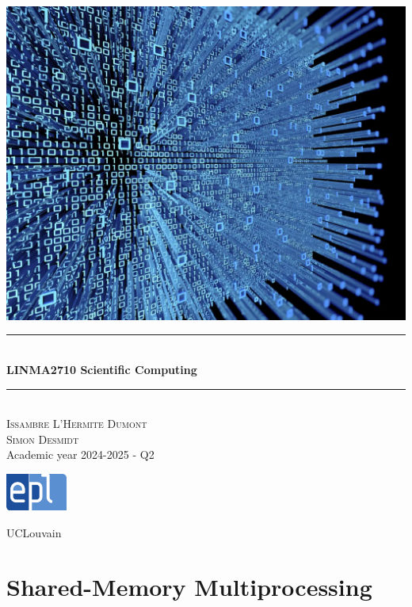 \documentclass[12pt, openany]{report}
\newcommand{\HRule}{\rule{\linewidth}{0.5mm}}
\theoremstyle{definition}
\begin{document}
\begin{titlepage}
    \begin{sffamily}
    \begin{center}
        \includegraphics[scale=0.25]{img/page_de_garde.png} \\[1cm]
        \HRule \\[0.4cm]
        { \huge \bfseries LINMA2710 Scientific Computing \\[0.4cm] }
    
        \HRule \\[1.5cm]
        \textsc{\LARGE Issambre L'Hermite Dumont \\ Simon Desmidt}\\[1cm]
        \vfill
        \vspace{2cm}
        {\large Academic year 2024-2025 - Q2}
        \vspace{0.4cm}
         
        \includegraphics[width=0.15\textwidth]{img/epl.png}
        
        UCLouvain\\
    
    \end{center}
    \end{sffamily}
\end{titlepage}

\setcounter{tocdepth}{1}
\tableofcontents
\chapter{Shared-Memory Multiprocessing}
\end{document}
